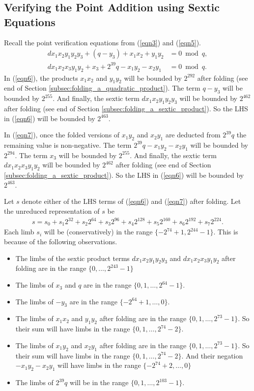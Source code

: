\documentclass[a4paper, 12pt]{article}
\begin{document}
\subsection{Verifying the Point Addition using Sextic Equations}%
\label{subsec:verifying_the_point_addition_sextic_equations}
Recall the point verification equations from (\ref{eqn3}) and (\ref{eqn5}).
\begin{align}
  dx_1x_2y_1y_2y_3 + (q - y_3) + x_1x_2 + y_1y_2 &= 0 \bmod q,\label{eqn6}\\
  dx_1x_2x_3y_1y_2 + x_3 + 2^{39}q - x_1y_2 - x_2y_1  &= 0 \bmod q.\label{eqn7}
\end{align}
In (\ref{eqn6}), the products $x_1x_2$ and $y_1y_2$ will be bounded by $2^{292}$ after folding (see end of Section \ref{subsec:folding_a_quadratic_product}). The term $q-y_3$ will be bounded by $2^{255}$. And finally, the sextic term $dx_1x_2y_1y_2y_3$ will be bounded by $2^{462}$ after folding (see end of Section \ref{subsec:folding_a_sextic_product}). So the LHS in (\ref{eqn6}) will be bounded by $2^{463}$.

In (\ref{eqn7}), once the folded versions of $x_1y_2$ and $x_2y_1$ are deducted from $2^{39}q$ the remaining value is non-negative. The term $2^{39}q-x_1y_2-x_2y_1$ will be bounded by $2^{294}$. The term $x_3$ will be bounded by $2^{255}$. And finally, the sextic term $dx_1x_2x_3y_1y_2$ will be bounded by $2^{462}$ after folding (see end of Section \ref{subsec:folding_a_sextic_product}). So the LHS in (\ref{eqn6}) will be bounded by $2^{463}$.

Let $s$ denote either of the LHS terms of (\ref{eqn6}) and (\ref{eqn7}) after folding. Let the unreduced representation of $s$ be
\begin{align*}
  s = s_0 + s_1 2^{32} + s_2 2^{64} + s_3 2^{96} + s_4 2^{128} + s_5 2^{160} + s_6 2^{192} + s_7 2^{224}.
\end{align*}
Each limb $s_i$ will be (conservatively) in the range $\{-2^{74}+1, 2^{244}-1\}$. This is because of the following observations.
\begin{itemize}
  \item The limbs of the sextic product terms $dx_1x_2y_1y_2y_3$ and $dx_1x_2x_3y_1y_2$ after folding are in the range $\{0,\ldots,2^{243}-1\}$
  \item The limbs of $x_3$ and $q$ are in the range $\{0,1,\ldots,2^{64}-1\}$.
  \item The limbs of $-y_3$ are in the range $\{-2^{64}+1,\ldots,0\}$.
  \item The limbs of $x_1x_2$ and $y_1y_2$ after folding are in the range $\{0,1,\ldots,2^{73}-1\}$. So their sum will have limbs in the range $\{0,1,\ldots,2^{74}-2\}$.
  \item The limbs of $x_1y_2$ and $x_2y_1$ after folding are in the range $\{0,1,\ldots,2^{73}-1\}$. So their sum will have limbs in the range $\{0,1,\ldots,2^{74}-2\}$. And their negation $-x_1y_2-x_2y_1$ will have limbs in the range $\{-2^{74}+2,\ldots,0\}$
  \item The limbs of $2^{39}q$ will be in the range $\{0,1,\ldots,2^{103}-1\}$.
\end{itemize}
\end{document}

